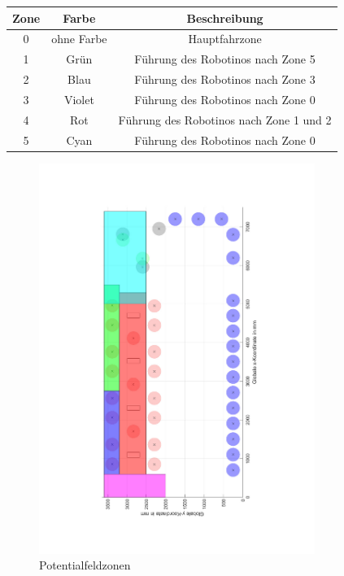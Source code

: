 \begin{table}
\centering
 \begin{tabular}{|c|c|c|}
  \hline Zone & Farbe & Beschreibung \\ 
  \hline 0 & ohne Farbe & Hauptfahrzone \\
  \hline 1 & Grün &  Führung des Robotinos nach Zone 5 \\
  \hline 2 & Blau &  Führung des Robotinos nach Zone 3 \\
  \hline 3 & Violet & Führung des Robotinos nach Zone 0 \\
  \hline 4 & Rot & Führung des Robotinos nach Zone 1 und 2\\
  \hline 5 & Cyan & Führung des Robotinos nach Zone 0 \\
   \hline \end{tabular}
   \label{tab:Zonen}
\end{table}

\begin{figure}
	\centering	\includegraphics[width=0.8\textwidth, angle=-90]{grafiken/Zonen_eingezeichnet.pdf}
	\caption{Potentialfeldzonen}
	\label{fig:PotZonen}
\end{figure}

